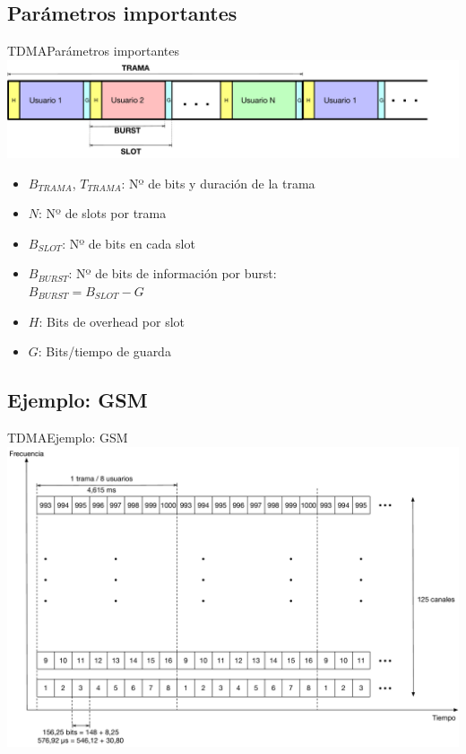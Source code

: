\documentclass[10pt,compress]{beamer} %
\begin{document}
\subsection{Parámetros importantes} 
\begin{frame}{TDMA}{Parámetros importantes}
  \centering \includegraphics[width=0.8\linewidth]{Figuras/TramasTDMA.pdf}
  \begin{itemize}
    \item $B_{TRAMA}$, $T_{TRAMA}$: Nº de bits y duración de la trama
    \item $N$: Nº de slots por trama
    \item $B_{SLOT}$: Nº de bits en cada slot
    \item $B_{BURST}$: Nº de bits de información por burst:\\
      $B_{BURST} = B_{SLOT} - G$
    \item $H$: Bits de overhead por slot
    \item $G$: Bits/tiempo de guarda
  \end{itemize}
\end{frame}

\subsection{Ejemplo: GSM}
\begin{frame}{TDMA}{Ejemplo: GSM}
  \centering \includegraphics[width=0.8\linewidth]{Figuras/AccesoAlMedioGSM.pdf}
\end{frame}
\end{document}

